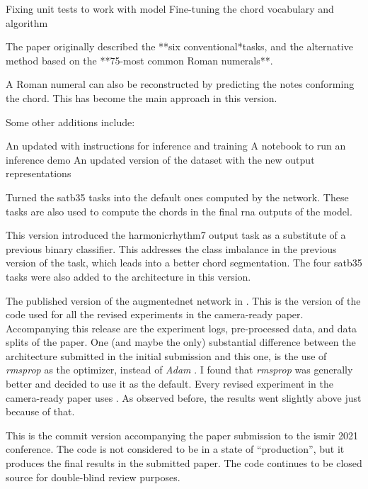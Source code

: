 Fixing unit tests to work with  model
Fine-tuning the chord vocabulary and
 algorithm


The paper originally described the **six conventional*tasks,
and the alternative method based on the **75-most common
Roman numerals**.

A Roman numeral can also be reconstructed by predicting the
notes conforming the chord. This has become the main
approach in this version.

Some other additions include:

An updated  with instructions for inference and
training A notebook to run an inference demo An updated
version of the dataset with the new output representations

Turned the \gls{satb35} tasks into the default ones computed
by the network. These tasks are also used to compute the
chords in the final \gls{rna} outputs of the model.

This version introduced the \gls{harmonicrhythm7} output
task as a substitute of a previous binary classifier. This
addresses the class imbalance in the previous version of the
task, which leads into a better chord segmentation. The four
\gls{satb35} tasks were also added to the architecture in
this version. 

The published version of the \gls{augmentednet} network in
\textcite{napoleslopez2021augmentednet}. This is the version
of the code used for all the revised experiments in the
camera-ready paper. Accompanying this release are the
experiment logs, pre-processed data, and data splits of the
paper. One (and maybe the only) substantial difference
between the architecture submitted in the initial submission
and this one, is the use of \emph{rmsprop} as the optimizer,
instead of \emph{Adam} \parencite{kingma2014adam}. I found
that \emph{rmsprop} was generally better and decided to use
it as the default. Every revised experiment in the
camera-ready paper uses . As observed before,
the results went slightly above just because of that.

This is the commit version accompanying the paper submission
to the \gls{ismir} 2021 conference. The code is not
considered to be in a state of ``production'', but it
produces the final results in the submitted paper. The code
continues to be closed source for double-blind review
purposes.

